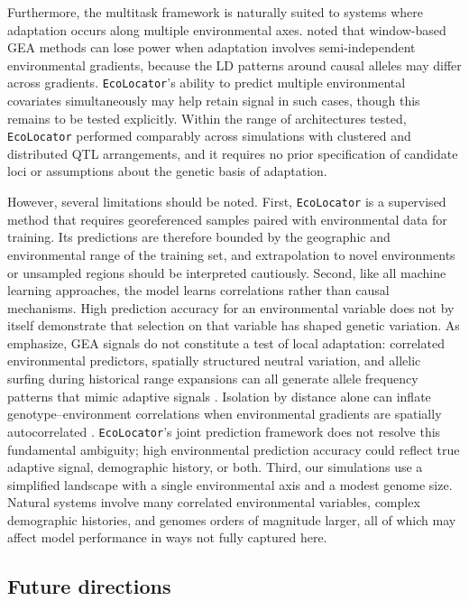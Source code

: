 \documentclass[]{article}
\newcommand{\ecolocator}{\texttt{EcoLocator}\xspace}
\begin{document}
Furthermore, the multitask framework
is naturally suited to systems
where adaptation occurs along multiple environmental axes.
\citet{booker_wza_2024} noted that window-based GEA methods
can lose power when adaptation involves
semi-independent environmental gradients,
because the LD patterns around causal alleles
may differ across gradients.
\ecolocator's ability to predict multiple environmental covariates
simultaneously may help retain signal in such cases,
though this remains to be tested explicitly.
Within the range of architectures tested,
\ecolocator performed comparably across simulations
with clustered and distributed QTL arrangements,
and it requires no prior specification of candidate loci
or assumptions about the genetic basis of adaptation.

However, several limitations should be noted.
First, \ecolocator is a supervised method
that requires georeferenced samples paired
with environmental data for training.
Its predictions are therefore bounded
by the geographic and environmental range of the training set,
and extrapolation to novel environments
or unsampled regions should be interpreted cautiously.
Second, like all machine learning approaches,
the model learns correlations rather than causal mechanisms.
High prediction accuracy for an environmental variable
does not by itself demonstrate that selection
on that variable has shaped genetic variation.
As \citet{booker_wza_2024} emphasize,
GEA signals do not constitute a test of local adaptation:
correlated environmental predictors,
spatially structured neutral variation,
and allelic surfing during historical range expansions
can all generate allele frequency patterns
that mimic adaptive signals
\citep{klopfstein_surfing_2006, novembre_spatial_2009}.
Isolation by distance alone can inflate
genotype--environment correlations
when environmental gradients are spatially autocorrelated
\citep{meirmans_ibd_2012}.
\ecolocator's joint prediction framework
does not resolve this fundamental ambiguity;
high environmental prediction accuracy
could reflect true adaptive signal, demographic history,
or both.
Third, our simulations use a simplified landscape
with a single environmental axis
and a modest genome size.
Natural systems involve many correlated environmental variables,
complex demographic histories,
and genomes orders of magnitude larger,
all of which may affect model performance in ways
not fully captured here.

\subsection{Future directions}
\end{document}
